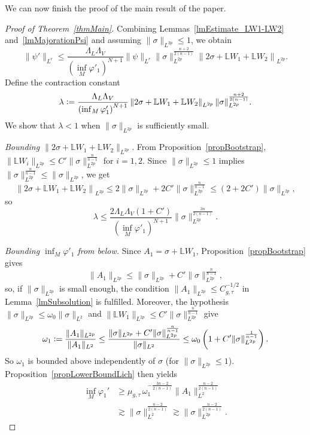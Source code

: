 \documentclass[a4paper, 10pt, reqno]{amsart}
\theoremstyle{plain}
\theoremstyle{remark}
\theoremstyle{definition}
\renewcommand{\phi}{\varphi}
\newcommand{\bL}{\mathbb{L}}
\newcommand{\definedas}{\mathrel{\raise.095ex\hbox{\rm :}\mkern-5.2mu=}}
\begin{document}
We can now finish the proof of the main result of the paper.

\begin{proof}[Proof of Theorem~\ref{thmMain}]
	Combining Lemmas~\ref{lmEstimate_LW1-LW2} and~\ref{lmMajorationPsi} and
	assuming $\|\sigma\|_{L^{2p}} \leq 1$, we obtain
	\[
		\|\psi'\|_{L^r}
		\leq \frac{\Lambda_L \Lambda_V}{\left(\inf_M \phi'_1\right)^{N+1}}
		\|\psi\|_{L^r} \|\sigma\|_{L^{2p}}^{\frac{n+2}{2(n-1)}}
		\left\|2 \sigma + \bL W_1 + \bL W_2\right\|_{L^{2p}}.
	\]
	Define the contraction constant
	\[
		\lambda \definedas \frac{\Lambda_L \Lambda_V}{\left(\inf_M \phi'_1\right)^{N+1}}
		\left\|2 \sigma + \bL W_1 + \bL W_2\right\|_{L^{2p}}
		\|\sigma\|_{L^{2p}}^{\frac{n+2}{2(n-1)}}.
	\]
	We show that $\lambda < 1$ when $\|\sigma\|_{L^{2p}}$ is sufficiently small.

	\medskip\noindent\textit{Bounding $\|2\sigma + \bL W_1 + \bL W_2\|_{L^{2p}}$.}
	From Proposition~\ref{propBootstrap}, $\|\bL W_i\|_{L^{2p}} \leq C'
		\|\sigma\|_{L^{2p}}^{\frac{n}{n-1}}$ for $i = 1, 2$. Since $\|\sigma\|_{L^{2p}}
		\leq 1$ implies $\|\sigma\|_{L^{2p}}^{\frac{n}{n-1}} \leq \|\sigma\|_{L^{2p}}$, we get
	\[
		\left\|2 \sigma + \bL W_1 + \bL W_2\right\|_{L^{2p}}
		\leq 2 \|\sigma\|_{L^{2p}} + 2 C' \|\sigma\|_{L^{2p}}^{\frac{n}{n-1}}
		\leq (2 + 2 C') \|\sigma\|_{L^{2p}},
	\]
	so
	\[
		\lambda \leq \frac{2\Lambda_L \Lambda_V (1 +C')}{\left(\inf_M \phi'_1\right)^{N+1}}
		\|\sigma\|_{L^{2p}}^{\frac{3n}{2(n-1)}}.
	\]

	\medskip\noindent\textit{Bounding $\inf_M \phi'_1$ from below.}
	Since $A_1 = \sigma + \bL W_1$, Proposition~\ref{propBootstrap} gives
	\[
		\|A_1\|_{L^{2p}} \leq \|\sigma\|_{L^{2p}} + C' \|\sigma\|_{L^{2p}}^{\frac{n}{n-1}},
	\]
	so, if $\|\sigma\|_{L^{2p}}$ is small enough, the condition $\|A_1\|_{L^{2p}}
		\leq C_{g,\tau}^{-1/2}$ in Lemma~\ref{lmSubsolution} is fulfilled. Moreover,
	the hypothesis $\|\sigma\|_{L^{2p}} \leq \omega_0 \|\sigma\|_{L^2}$ and $\|\bL
		W_1\|_{L^{2p}} \leq C' \|\sigma\|_{L^{2p}}^{\frac{n}{n-1}}$ give
	\[
		\omega_1 \definedas \frac{\|A_1\|_{L^{2p}}}{\|A_1\|_{L^2}}
		\leq \frac{\|\sigma\|_{L^{2p}} + C' \|\sigma\|_{L^{2p}}^{\frac{n}{n-1}}}{\|\sigma\|_{L^2}}
		\leq \omega_0 \left(1 + C' \|\sigma\|_{L^{2p}}^{\frac{1}{n-1}}\right).
	\]
	So $\omega_1$ is bounded above independently of $\sigma$ (for
	$\|\sigma\|_{L^{2p}} \leq 1$). Proposition~\ref{propLowerBoundLich} then yields
	\begin{align*}
		\inf_M \phi_1'
		 & \geq \mu_{g, \tau}\, \omega_1^{-\frac{3n-2}{2(n-1)}} \|A_1\|_{L^2}^{\frac{n-2}{2(n-1)}} \\
		 & \gtrsim \|\sigma\|_{L^2}^{\frac{n-2}{2(n-1)}}
		\gtrsim \|\sigma\|_{L^{2p}}^{\frac{n-2}{2(n-1)}}.
	\end{align*}


\end{proof}
\end{document}
